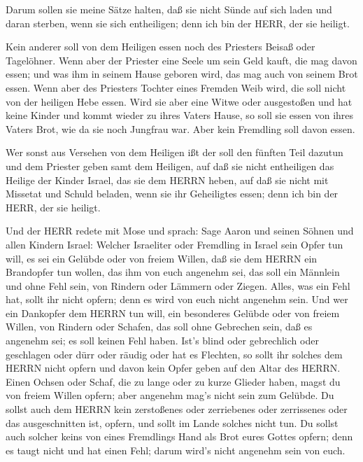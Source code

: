  Darum sollen sie meine Sätze halten, daß sie nicht Sünde
auf sich laden und daran sterben, wenn sie sich entheiligen; denn ich
bin der HERR, der sie heiligt.

 Kein anderer soll von dem Heiligen essen noch des
Priesters Beisaß oder Tagelöhner.  Wenn aber der Priester
eine Seele um sein Geld kauft, die mag davon essen; und was ihm in
seinem Hause geboren wird, das mag auch von seinem Brot essen.
 Wenn aber des Priesters Tochter eines Fremden Weib wird,
die soll nicht von der heiligen Hebe essen.  Wird sie aber
eine Witwe oder ausgestoßen und hat keine Kinder und kommt wieder zu
ihres Vaters Hause, so soll sie essen von ihres Vaters Brot, wie da sie
noch Jungfrau war. Aber kein Fremdling soll davon essen.

 Wer sonst aus Versehen von dem Heiligen ißt der soll den
fünften Teil dazutun und dem Priester geben samt dem Heiligen,
 auf daß sie nicht entheiligen das Heilige der Kinder
Israel, das sie dem HERRN heben,  auf daß sie nicht mit
Missetat und Schuld beladen, wenn sie ihr Geheiligtes essen; denn ich
bin der HERR, der sie heiligt.

 Und der HERR redete mit Mose und sprach: 
Sage Aaron und seinen Söhnen und allen Kindern Israel: Welcher
Israeliter oder Fremdling in Israel sein Opfer tun will, es sei ein
Gelübde oder von freiem Willen, daß sie dem HERRN ein Brandopfer tun
wollen, das ihm von euch angenehm sei,  das soll ein
Männlein und ohne Fehl sein, von Rindern oder Lämmern oder Ziegen.
 Alles, was ein Fehl hat, sollt ihr nicht opfern; denn es
wird von euch nicht angenehm sein.  Und wer ein Dankopfer
dem HERRN tun will, ein besonderes Gelübde oder von freiem Willen, von
Rindern oder Schafen, das soll ohne Gebrechen sein, daß es angenehm sei;
es soll keinen Fehl haben.  Ist's blind oder gebrechlich
oder geschlagen oder dürr oder räudig oder hat es Flechten, so sollt ihr
solches dem HERRN nicht opfern und davon kein Opfer geben auf den Altar
des HERRN.  Einen Ochsen oder Schaf, die zu lange oder zu
kurze Glieder haben, magst du von freiem Willen opfern; aber angenehm
mag's nicht sein zum Gelübde.  Du sollst auch dem HERRN
kein zerstoßenes oder zerriebenes oder zerrissenes oder das
ausgeschnitten ist, opfern, und sollt im Lande solches nicht tun.
 Du sollst auch solcher keins von eines Fremdlings Hand als
Brot eures Gottes opfern; denn es taugt nicht und hat einen Fehl; darum
wird's nicht angenehm sein von euch.

